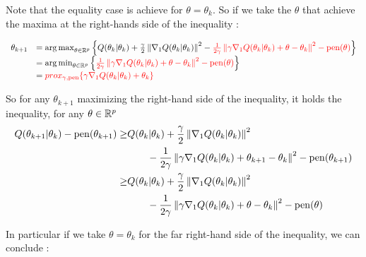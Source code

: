 \documentclass[a4paper]{article}
\begin{document}
\begin{myText}
\begin{dem}
    Note that the equality case is achieve for $\theta = \theta_k$. 
    So if we take the $\theta$ that achieve the maxima at the right-hands side of the inequality :
    
    \begin{equation}\label{prox_arrival} \begin{array}{llllllll} 
    \theta_{k+1} &= \operatorname*{arg\,max}_{\theta\in\mathbb R^p}\left\{ Q(\theta_k|\theta_k) + \frac \gamma2 \left\|\nabla_1 Q(\theta_k|\theta_k)\right\|^2 - \textcolor{red}{\frac 1{2\gamma}\left\|\gamma \nabla_1 Q(\theta_k|\theta_k) + \theta - \theta_k\right\|^2 -\mathrm{pen}(\theta)} \right\} 
        \\ &= \operatorname*{arg\,min}_{\theta\in\mathbb R^p} \left\{ \textcolor{red}{\frac 1{2\gamma}\left\|\gamma \nabla_1 Q(\theta_k|\theta_k) + \theta - \theta_k\right\|^2 -\mathrm{pen}(\theta) }\right\}
        \\ & = \textcolor{red}{prox_{\gamma, \mathrm{pen}}\{\gamma \nabla_1 Q(\theta_k|\theta_k) + \theta_k \}  }   \end{array}
    \end{equation}
    
    So for any $\theta_{k+1}$ maximizing the right-hand side of the inequality, it holds the inequality, for any $\theta\in\mathbb R^p$
    \begin{align*}
        Q(\theta_{k+1}|\theta_k) -\mathrm{pen}(\theta_{k+1}) 
        \geq & Q(\theta_k|\theta_k) 
                   + \frac \gamma2 \left\|\nabla_1 Q(\theta_k|\theta_k)\right\|^2 
                   \\ &\qquad - \frac 1{2\gamma}\left\|\gamma \nabla_1 Q(\theta_k|\theta_k) + \theta_{k+1} - \theta_k\right\|^2 -\mathrm{pen}(\theta_{k+1})
   \\   \geq & Q(\theta_k|\theta_k) 
                   + \frac \gamma2 \left\|\nabla_1 Q(\theta_k|\theta_k)\right\|^2 
                   \\ &\qquad - \frac 1{2\gamma}\left\|\gamma \nabla_1 Q(\theta_k|\theta_k) + \theta - \theta_k\right\|^2 -\mathrm{pen}(\theta)
    \end{align*}

    In particular if we take $\theta = \theta_k$ for the far right-hand side of the inequality, we can conclude : 

    \begin{center}
    \end{center}
    
\end{dem}

\begin{rem}

\end{rem}













\end{myText}
\end{document}
